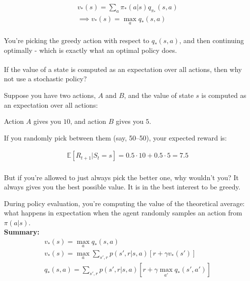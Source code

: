  \begin{equation}
    \begin{split}
        v_*(s) = \sum_{a} \pi_*(a|s) q_{\pi_*}(s, a) \\
        \implies v_*(s) = \max_{a} q_*(s, a) \\
        \label{eq:mdp-optimal-value-function-2}
    \end{split}
 \end{equation}

You're picking the greedy action with respect to $q_*(s, a)$, and then continuing optimally
 -  which is exactly what an optimal policy does.\\\\
If the value of a state is computed as an expectation over all actions, then why not use a
stochastic policy?

Suppose you have two actions, $A$ and $B$, and the value of state $s$ is computed as
 an expectation over all actions:

 Action $A$ gives you $10$, and action $B$ gives you $5$.

 If you randomly pick between them (say, 50–50), your expected reward is:

 \begin{equation}
    \begin{split}
        \mathbb{E}[R_{t+1} | S_t = s] = 0.5 \cdot 10 + 0.5 \cdot 5 = 7.5 \\
    \end{split}
 \end{equation}

 But if you're allowed to just always pick the better one, why wouldn't you? It always
 gives you the best possible value. It is in the best interest to be greedy.

 During policy evaluation, you're computing the value of the theoretical average:
 what happens in expectation when the agent randomly samples an action from 
 $\pi(a|s)$.\\


\textbf{Summary:}
\begin{equation}
    \begin{split}
        v_*(s) = \max_{a} q_*(s, a) \\
        v_*(s) = \max_{a} \sum_{s',r} p(s',r|s, a) [r + \gamma v_*(s')] \\
        q_*(s, a) = \sum_{s',r} p(s',r|s, a) [r + \gamma \max_{a'} q_*(s', a')] \\
        \label{eq:mdp-optimal-value-function-3}
    \end{split}
 \end{equation}


